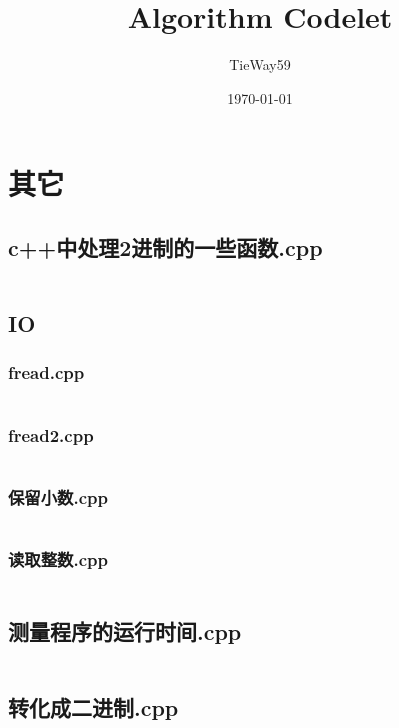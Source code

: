 \documentclass[a4paper,11pt]{article}
\author{TieWay59}
\title{Algorithm Codelet}
\date{\today}
\begin{document}
 
\maketitle          %
\newpage            %
\tableofcontents    %

\newpage

\section{其它}
\subsection{c++中处理2进制的一些函数.cpp}
\inputminted[linenos,breaklines,fontseries=heiti]{c++}{"D:/tmplz/templates/其它/c++中处理2进制的一些函数.cpp"}
\subsection{IO}
\subsubsection{fread.cpp}
\inputminted[linenos,breaklines,fontseries=heiti]{c++}{"D:/tmplz/templates/其它/IO/fread.cpp"}
\subsubsection{fread2.cpp}
\inputminted[breaklines]{c++}{"D:/tmplz/templates/其它/IO/fread2.cpp"}
\subsubsection{保留小数.cpp}
\inputminted[breaklines]{c++}{"D:/tmplz/templates/其它/IO/保留小数.cpp"}
\subsubsection{读取整数.cpp}
\inputminted[breaklines]{c++}{"D:/tmplz/templates/其它/IO/读取整数.cpp"}
\subsection{测量程序的运行时间.cpp}
\inputminted[breaklines]{c++}{"D:/tmplz/templates/其它/测量程序的运行时间.cpp"}
\subsection{转化成二进制.cpp}
\inputminted[breaklines]{c++}{"D:/tmplz/templates/其它/转化成二进制.cpp"}
\end{document}
